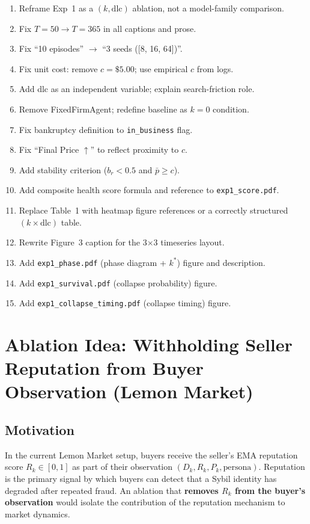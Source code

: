 \documentclass{article}
\begin{document}
\begin{enumerate}
  \item[$\square$] Reframe Exp~1 as a $(k, \mathrm{dlc})$ ablation, not a
        model-family comparison.
  \item[$\square$] Fix $T = 50 \to T = 365$ in all captions and prose.
  \item[$\square$] Fix ``10 episodes'' $\to$ ``3 seeds ([8, 16, 64])''.
  \item[$\square$] Fix unit cost: remove $c = \$5.00$; use empirical $c$ from logs.
  \item[$\square$] Add dlc as an independent variable; explain search-friction role.
  \item[$\square$] Remove FixedFirmAgent; redefine baseline as $k=0$ condition.
  \item[$\square$] Fix bankruptcy definition to \texttt{in\_business} flag.
  \item[$\square$] Fix ``Final Price $\uparrow$'' to reflect proximity to $c$.
  \item[$\square$] Add stability criterion ($b_r < 0.5$ and $\bar{p} \geq c$).
  \item[$\square$] Add composite health score formula and reference to
        \texttt{exp1\_score.pdf}.
  \item[$\square$] Replace Table~1 with heatmap figure references or a
        correctly structured $(k \times \mathrm{dlc})$ table.
  \item[$\square$] Rewrite Figure~3 caption for the 3$\times$3 timeseries layout.
  \item[$\square$] Add \texttt{exp1\_phase.pdf} (phase diagram + $k^*$) figure
        and description.
  \item[$\square$] Add \texttt{exp1\_survival.pdf} (collapse probability) figure.
  \item[$\square$] Add \texttt{exp1\_collapse\_timing.pdf} (collapse timing) figure.
\end{enumerate}
\section{Ablation Idea: Withholding Seller Reputation from Buyer Observation (Lemon Market)}

\subsection{Motivation}

In the current Lemon Market setup, buyers receive the seller's EMA reputation score $R_k \in [0,1]$ as part of their observation $(D_k, R_k, P_k, \text{persona})$. Reputation is the primary signal by which buyers can detect that a Sybil identity has degraded after repeated fraud. An ablation that \textbf{removes $R_k$ from the buyer's observation} would isolate the contribution of the reputation mechanism to market dynamics.
\end{document}
